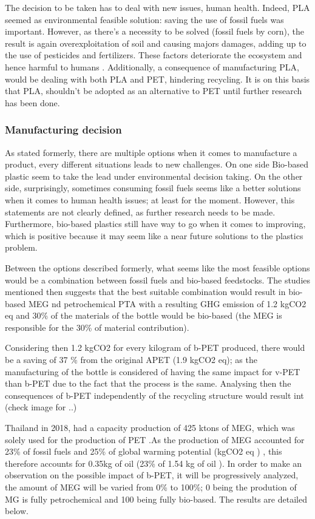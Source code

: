 \documentclass[twoside,a4paper,12pt]{report}
\begin{document}
The decision to be taken has to deal with new issues, human health. Indeed, PLA seemed as environmental feasible solution: saving the use of fossil fuels was important. However, as there's a necessity to be solved (fossil fuels by corn), the result is again overexploitation of soil and causing majors damages, adding up to the use of pesticides and fertilizers. These factors deteriorate the ecosystem and hence harmful to humans \cite{Gironi2011}. Additionally, a consequence of manufacturing PLA, would be dealing with both PLA and PET, hindering recycling. It is on this basis that PLA, shouldn't be adopted as an alternative to PET until further research has been done.

\subsubsection{Manufacturing decision}

As stated formerly, there are multiple options when it comes to manufacture a product, every different situations leads to new challenges. On one side Bio-based plastic seem to take the lead under environmental decision taking. On the other side, surprisingly, sometimes consuming fossil fuels seems like a better solutions when it comes to human health issues; at least for the moment. However, this statements are not clearly defined, as further research needs to be made. Furthermore, bio-based plastics still have way to go when it comes to improving, which is positive because it may seem like a near future solutions to the plastics problem.

Between the options described formerly, what seems like the most feasible options would be a combination between fossil fuels and bio-based feedstocks. The studies mentioned then suggests that the best suitable combination would result in  bio-based MEG nd petrochemical PTA with a resulting GHG emission of 1.2 kgCO2 eq and 30\% of the materials of the bottle would be bio-based (the MEG is responsible for the 30\% of material contribution). 

Considering then 1.2 kgCO2 for every kilogram of b-PET produced, there would be a saving of 37 \% from the original APET (1.9 kgCO2 eq); as the manufacturing of the bottle is considered of having the same impact for v-PET than b-PET due to the fact that the process is the same. Analysing then the consequences of b-PET independently of the recycling structure would result int (check image for ..)

Thailand in 2018, had a capacity production of 425 ktons of MEG, which was solely used for the production of PET \cite{PTITpetrochem2018}.As the production of MEG accounted for 23\% of fossil fuels and 25\% of global warming potential (kgCO2 eq ) \cite{PEPETecoprofile}, this therefore accounts for 0.35kg of oil (23\% of 1.54 kg of oil \cite{Perugini2004}). In order to make an observation on the possible impact of b-PET, it will be progressively analyzed, the amount of MEG will be varied from 0\% to 100\%; 0 being the prodution of MG is fully petrochemical and 100 being fully bio-based. The results are detailed below.
\end{document}
